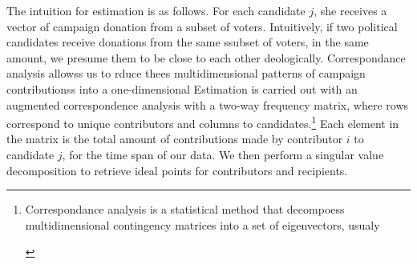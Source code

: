 \documentclass[12pt,english]{article}
\newcommand{\note}[1]{\footnote{ \begin{doublespace}#1  \end{doublespace}}}
\numberwithin{equation}{section}
\theoremstyle{plain}
\theoremstyle{remark}
\theoremstyle{plain}
\begin{document}
The intuition for estimation is as follows. For each candidate $j$, she receives a vector of campaign donation from a subset of voters. Intuitively, if two political candidates receive donations from the same ssubset of voters, in the same amount, we presume them to be close to each other deologically. Correspondance analysis allowss us to rduce thees multidimensional patterns of campaign contributionss into a one-dimensional Estimation is carried out with an augmented correspondence analysis with a two-way frequency matrix, where rows correspond to unique contributors and columns to candidates.\note{Correspondance analysis is a statistical method that decompoess multidimensional contingency matrices into a set of eigenvectors, usualy } Each element in the matrix is the total amount of contributions made by contributor $i$ to candidate $j$, for the time span of our data. We then perform a singular value decomposition to retrieve ideal points for contributors and recipients.
    
    
\end{document}
